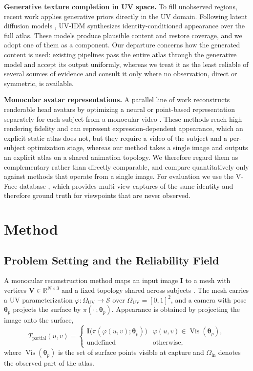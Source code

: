 \documentclass[runningheads]{llncs}
\newcommand{\R}{\mathbb{R}}
\newcommand{\OUV}{\Omega_{\text{UV}}}
\newcommand{\Oin}{\Omega_{\text{in}}}
\newcommand{\Vis}{\operatorname{Vis}}
\newcommand{\Tpartial}{T_{\text{partial}}}
\begin{document}
\textbf{Generative texture completion in UV space.} To fill unobserved regions,
recent work applies generative priors directly in the UV domain. Following
latent diffusion models \cite{rombach2022ldm}, UV-IDM \cite{li2024uvidm}
synthesizes identity-conditioned appearance over the full atlas. These models
produce plausible content and restore coverage, and we adopt one of them as a
component. Our departure concerns how the generated content is used: existing
pipelines pass the entire atlas through the generative model and accept its
output uniformly, whereas we treat it as the least reliable of several sources
of evidence and consult it only where no observation, direct or symmetric, is
available.

\textbf{Monocular avatar representations.} A parallel line of work reconstructs
renderable head avatars by optimizing a neural or point-based representation
separately for each subject from a monocular video
\cite{gafni2021nerface,grassal2022nha,qian2024gaussianavatars,zhang2025fate}.
These methods reach high rendering fidelity and can represent
expression-dependent appearance, which an explicit static atlas does not, but
they require a video of the subject and a per-subject optimization stage,
whereas our method takes a single image and outputs an explicit atlas on a
shared animation topology. We therefore regard them as complementary rather
than directly comparable, and compare quantitatively only against methods that
operate from a single image. For evaluation we use the V-Face database
\cite{duong2022vface}, which provides multi-view captures of the same identity
and therefore ground truth for viewpoints that are never observed.

\section{Method}

\subsection{Problem Setting and the Reliability Field}
\label{sec:setting}

A monocular reconstruction method maps an input image $\mathbf{I}$ to a mesh
with vertices $\mathbf{V} \in \R^{N \times 3}$ and a fixed topology shared
across subjects \cite{li2017flame,feng2021deca}. The mesh carries a UV
parameterization $\varphi\colon \OUV \to \mathcal{S}$ over $\OUV = [0,1]^2$,
and a camera with pose $\bm{\theta}_p$ projects the surface by
$\pi(\cdot\,;\bm{\theta}_p)$. Appearance is obtained by projecting the image
onto the surface,
\begin{equation}
  \Tpartial(u,v) =
  \begin{cases}
    \mathbf{I}\bigl(\pi(\varphi(u,v);\bm{\theta}_p)\bigr)
      & \varphi(u,v) \in \Vis(\bm{\theta}_p),\\[2pt]
    \text{undefined} & \text{otherwise},
  \end{cases}
  \label{eq:baking}
\end{equation}
where $\Vis(\bm{\theta}_p)$ is the set of surface points visible at capture and
$\Oin$ denotes the observed part of the atlas.
\end{document}
